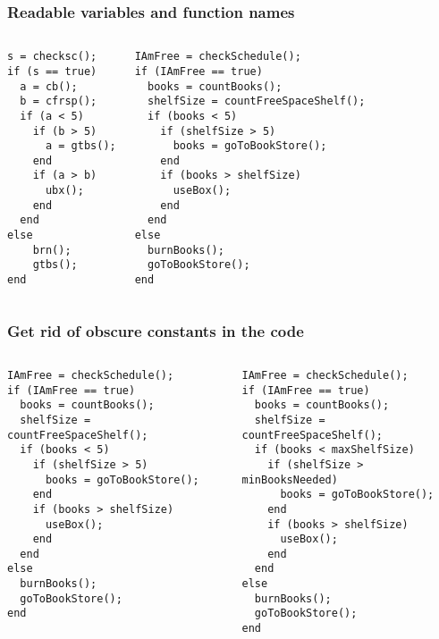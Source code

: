 \begin{frame}[fragile]
 \frametitle{Readable variables and function names}
 \begin{columns}[T]
\begin{lstlisting}
s = checksc();
if (s == true)
  a = cb();
  b = cfrsp();
  if (a < 5)
    if (b > 5)
      a = gtbs();
    end
    if (a > b)
      ubx();
    end
  end
else
    brn();
    gtbs();
end
 \end{lstlisting}
     \begin{lstlisting}
IAmFree = checkSchedule();
if (IAmFree == true)
  books = countBooks();
  shelfSize = countFreeSpaceShelf();
  if (books < 5)
    if (shelfSize > 5)
      books = goToBookStore();
    end
    if (books > shelfSize)
      useBox();
    end
  end
else
  burnBooks();
  goToBookStore();
end
 \end{lstlisting}
 \end{columns}
\end{frame}

\begin{frame}[fragile]
 \frametitle{Get rid of obscure constants in the code}
 \begin{columns}[T]
     \begin{lstlisting}[basicstyle=\scriptsize\ttfamily]
IAmFree = checkSchedule();
if (IAmFree == true)
  books = countBooks();
  shelfSize = countFreeSpaceShelf();
  if (books < 5)
    if (shelfSize > 5)
      books = goToBookStore();
    end
    if (books > shelfSize)
      useBox();
    end
  end
else
  burnBooks();
  goToBookStore();
end
 \end{lstlisting}
     \begin{lstlisting}[basicstyle=\scriptsize\ttfamily,emph={minBooksNeeded,maxShelfSize},emphstyle=\color{red}]
IAmFree = checkSchedule();
if (IAmFree == true)
  books = countBooks();
  shelfSize = countFreeSpaceShelf();
  if (books < maxShelfSize)
    if (shelfSize > minBooksNeeded)
      books = goToBookStore();
    end
    if (books > shelfSize)
      useBox();
    end
  end
else
  burnBooks();
  goToBookStore();
end
 \end{lstlisting}
 \end{columns}
\end{frame}

